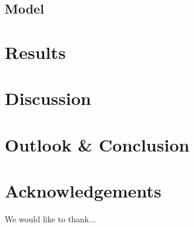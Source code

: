 \documentclass{scrartcl}
\begin{document}
\subsection{Model}


\newpage
\section{Results}\label{sec:results}



\newpage
\section{Discussion}\label{sec:discussion}

\section{Outlook \& Conclusion}\label{sec:outlook_conclusion}

\section{Acknowledgements}
We would like to thank...

\newpage

%
%
%
%

\end{document}

